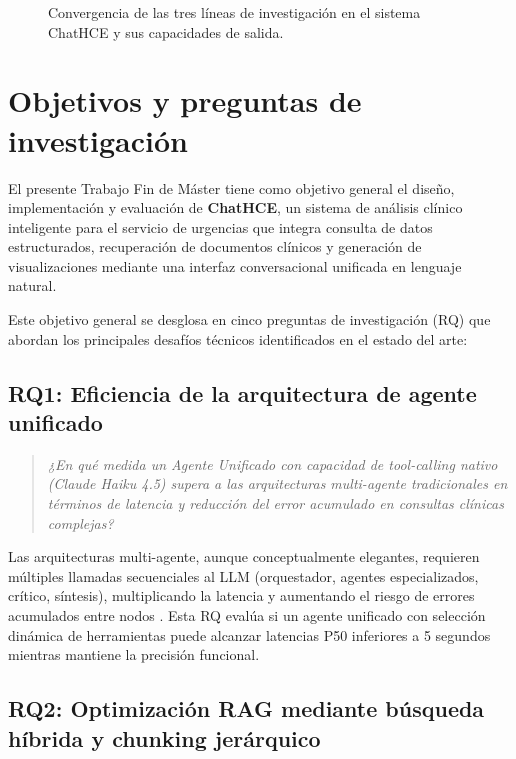 \begin{figure}[H]
{
}%
\caption{Convergencia de las tres líneas de investigación en el sistema ChatHCE y sus capacidades de salida.}
\label{fig:convergencia}
\end{figure}

\section{Objetivos y preguntas de investigación}
\label{sec:objetivos}

El presente Trabajo Fin de Máster tiene como objetivo general el diseño, implementación y evaluación de \textbf{ChatHCE}, un sistema de análisis clínico inteligente para el servicio de urgencias que integra consulta de datos estructurados, recuperación de documentos clínicos y generación de visualizaciones mediante una interfaz conversacional unificada en lenguaje natural.

Este objetivo general se desglosa en cinco preguntas de investigación (\acs{RQ}) que abordan los principales desafíos técnicos identificados en el estado del arte:

\subsection{RQ1: Eficiencia de la arquitectura de agente unificado}

\begin{quote}
\textit{¿En qué medida un Agente Unificado con capacidad de tool-calling nativo (Claude Haiku 4.5) supera a las arquitecturas multi-agente tradicionales en términos de latencia y reducción del error acumulado en consultas clínicas complejas?}
\end{quote}

Las arquitecturas multi-agente, aunque conceptualmente elegantes, requieren múltiples llamadas secuenciales al \ac{LLM} (orquestador, agentes especializados, crítico, síntesis), multiplicando la latencia y aumentando el riesgo de errores acumulados entre nodos \parencite{Zuo2025KG4Diagnosis}. Esta \ac{RQ} evalúa si un agente unificado con selección dinámica de herramientas puede alcanzar latencias P50 inferiores a 5 segundos mientras mantiene la precisión funcional.

\subsection{RQ2: Optimización \acs{RAG} mediante búsqueda híbrida y chunking jerárquico}

